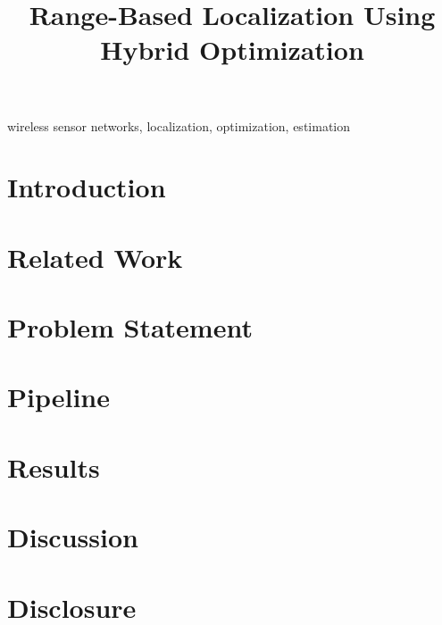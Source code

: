 \documentclass[conference]{IEEEtran}
\begin{document}
\title{Range-Based Localization Using Hybrid Optimization}

\author{
}

\maketitle

\begin{abstract}


\end{abstract}

\begin{IEEEkeywords}
wireless sensor networks, localization, optimization, estimation
\end{IEEEkeywords}

\section{Introduction}
\label{sec:intro}


\section{Related Work}
\label{sec:related-work}


\section{Problem Statement}
\label{sec:prob-statement}



\section{Pipeline}
\label{sec:pipeline}


\section{Results}
\label{sec:result}



\section{Discussion}



\section{Disclosure}



\printbibliography
\end{document}
